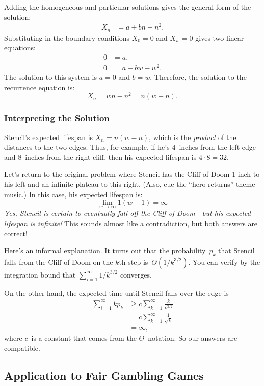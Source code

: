 Adding the homogeneous and particular solutions gives the general form
of the solution:
%
\begin{align*}
    X_n & = a + b n - n^2.
\end{align*}
%
Substituting in the boundary conditions $X_0 = 0$ and $X_w = 0$ gives
two linear equations:
%
\begin{align*}
0 & = a, \\
0 & = a + b w - w^2.
\end{align*}
%
The solution to this system is $a = 0$ and $b = w$.  Therefore, the
solution to the recurrence equation is:
%
\[
X_n = w n - n^2 = n (w - n).
\]

\subsubsection{Interpreting the Solution}

Stencil's expected lifespan is $X_n = n (w - n)$, which is the
\emph{product} of the distances to the two edges.  Thus, for example,
if he's 4~inches from the left edge and 8~inches from the right cliff,
then his expected lifespan is $4 \cdot 8 = 32$.

Let's return to the original problem where Stencil has the Cliff of
Doom 1 inch to his left and an infinite plateau to this right.  (Also,
cue the ``hero returns'' theme music.)  In this case, his expected
lifespan is:
%
\[
\lim_{w \to \infty} 1 (w - 1) = \infty
\]
%
\emph{Yes, Stencil is certain to eventually fall off the Cliff of
  Doom---but his expected lifespan is infinite!}  This sounds almost
like a contradiction, but both answers are correct!

Here's an informal explanation.  It turns out that the
probability~$p_k$ that Stencil falls from the Cliff of Doom on the
$k$th step is~$\Theta(1/k^{3/2})$.  You can verify by the integration
bound that $\sum_{i = 1}^\infty 1/k^{3/2}$ converges.

On the other hand, the expected time until Stencil falls over the edge
is
\begin{align*}
\sum_{i = 1}^\infty k p_k
    &\ge c \sum_{k = 1}^\infty \frac{k}{k^{3/2}} \\
    &=   c \sum_{k = 1}^\infty \frac{1}{\sqrt{k}} \\
    &=   \infty,
\end{align*}
where $c$~is a constant that comes from the $\Theta$~notation.  So our
answers are compatible.

\subsection{Application to Fair Gambling Games}

